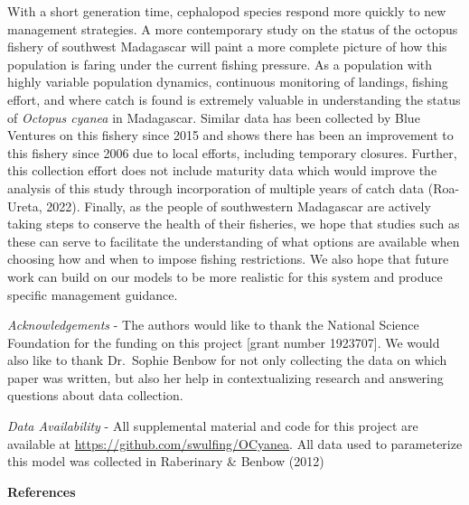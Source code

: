 \documentclass[
]{article}
\begin{document}
With a short generation time, cephalopod species respond more quickly to new management strategies. A more contemporary study on the status of the octopus fishery of southwest Madagascar will paint a more complete picture of how this population is faring under the current fishing pressure. As a population with highly variable population dynamics, continuous monitoring of landings, fishing effort, and where catch is found is extremely valuable in understanding the status of \emph{Octopus cyanea} in Madagascar. Similar data has been collected by Blue Ventures on this fishery since 2015 and shows there has been an improvement to this fishery since 2006 due to local efforts, including temporary closures. Further, this collection effort does not include maturity data which would improve the analysis of this study through incorporation of multiple years of catch data (Roa-Ureta, 2022). Finally, as the people of southwestern Madagascar are actively taking steps to conserve the health of their fisheries, we hope that studies such as these can serve to facilitate the understanding of what options are available when choosing how and when to impose fishing restrictions. We also hope that future work can build on our models to be more realistic for this system and produce specific management guidance.

\emph{Acknowledgements} - The authors would like to thank the National Science Foundation for the funding on this project {[}grant number 1923707{]}. We would also like to thank Dr.~Sophie Benbow for not only collecting the data on which paper was written, but also her help in contextualizing research and answering questions about data collection.

\emph{Data Availability} - All supplemental material and code for this project are available at \url{https://github.com/swulfing/OCyanea}. All data used to parameterize this model was collected in Raberinary \& Benbow (2012)

\newpage

\textbf{References}
\end{document}
